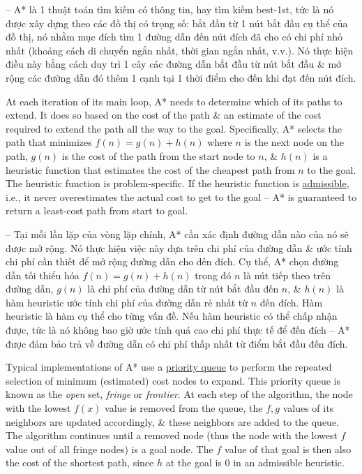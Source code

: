 \documentclass{article}
\begin{document}
-- A* là 1 thuật toán tìm kiếm có thông tin, hay tìm kiếm best-1st, tức là nó được xây dựng theo các đồ thị có trọng số: bắt đầu từ 1 nút bắt đầu cụ thể của đồ thị, nó nhằm mục đích tìm 1 đường dẫn đến nút đích đã cho có chi phí nhỏ nhất (khoảng cách di chuyển ngắn nhất, thời gian ngắn nhất, v.v.). Nó thực hiện điều này bằng cách duy trì 1 cây các đường dẫn bắt đầu từ nút bắt đầu \& mở rộng các đường dẫn đó thêm 1 cạnh tại 1 thời điểm cho đến khi đạt đến nút đích.

At each iteration of its main loop, A* needs to determine which of its paths to extend. It does so based on the cost of the path \& an estimate of the cost required to extend the path all the way to the goal. Specifically, A* selects the path that minimizes $f(n) = g(n) + h(n)$ where $n$ is the next node on the path, $g(n)$ is the cost of the path from the start node to $n$, \& $h(n)$ is a heuristic function that estimates the cost of the cheapest path from $n$ to the goal. The heuristic function is problem-specific. If the heuristic function is \href{https://en.wikipedia.org/wiki/Admissible_heuristic}{admissible}, i.e., it never overestimates the actual cost to get to the goal -- A* is guaranteed to return a least-cost path from start to goal.

-- Tại mỗi lần lặp của vòng lặp chính, A* cần xác định đường dẫn nào của nó sẽ được mở rộng. Nó thực hiện việc này dựa trên chi phí của đường dẫn \& ước tính chi phí cần thiết để mở rộng đường dẫn cho đến đích. Cụ thể, A* chọn đường dẫn tối thiểu hóa $f(n) = g(n) + h(n)$ trong đó $n$ là nút tiếp theo trên đường dẫn, $g(n)$ là chi phí của đường dẫn từ nút bắt đầu đến $n$, \& $h(n)$ là hàm heuristic ước tính chi phí của đường dẫn rẻ nhất từ $n$ đến đích. Hàm heuristic là hàm cụ thể cho từng vấn đề. Nếu hàm heuristic có thể chấp nhận được, tức là nó không bao giờ ước tính quá cao chi phí thực tế để đến đích -- A* được đảm bảo trả về đường dẫn có chi phí thấp nhất từ điểm bắt đầu đến đích.

Typical implementations of A* use a \href{https://en.wikipedia.org/wiki/Priority_queue}{priority queue} to perform the repeated selection of minimum (estimated) cost nodes to expand. This priority queue is known as the {\it open} set, {\it fringe} or {\it frontier}. At each step of the algorithm, the node with the lowest $f(x)$ value is removed from the queue, the $f,g$ values of its neighbors are updated accordingly, \& these neighbors are added to the queue. The algorithm continues until a removed node (thus the node with the lowest $f$ value out of all fringe nodes) is a goal node. The $f$ value of that goal is then also the cost of the shortest path, since $h$ at the goal is 0 in an admissible heuristic.
\end{document}
